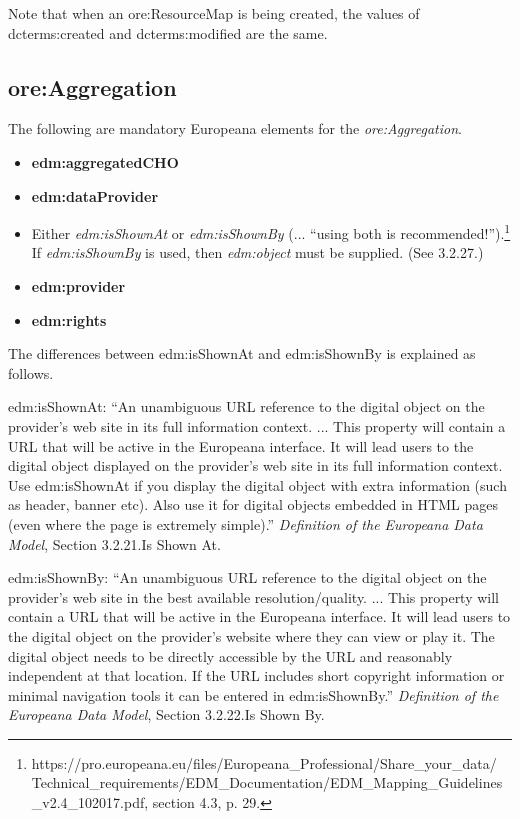 \documentclass[11pt]{article}
\begin{document}
Note that when an ore:ResourceMap is being created, the values of dcterms:created and dcterms:modified are the same.

\subsection{ore:Aggregation}

The following are mandatory Europeana elements for the \textit{ore:Aggregation}.

\begin{itemize}
\item \textbf{edm:aggregatedCHO}
\item \textbf{edm:dataProvider}
\item Either \textit{edm:isShownAt} or \textit{edm:isShownBy} (... ``using both is recommended!'').\footnote{https://pro.europeana.eu/files/Europeana\_Professional/Share\_your\_data/
Technical\_requirements/EDM\_Documentation/EDM\_Mapping\_Guidelines\_v2.4\_102017.pdf, section 4.3, p. 29.} If \textit{edm:isShownBy} is used, then \textit{edm:object} must be supplied. (See 3.2.27.)
\item \textbf{edm:provider}
\item \textbf{edm:rights}
\end{itemize}

The differences between edm:isShownAt and edm:isShownBy is explained as follows.

edm:isShownAt: ``An unambiguous URL reference to the digital object on the provider’s web
site in its full information context. ... This property will contain a URL that will be active in the Europeana
interface. It will lead users to the digital object displayed on the provider’s
web site in its full information context. Use edm:isShownAt if you display the
digital object with extra information (such as header, banner etc). Also use it
for digital objects embedded in HTML pages (even where the page is
extremely simple).'' \textit{Definition of the Europeana Data Model}, Section 3.2.21.Is Shown At.

edm:isShownBy: ``An unambiguous URL reference to the digital object on the provider’s web
site in the best available resolution/quality. ... This property will contain a URL that will be active in the Europeana
interface. It will lead users to the digital object on the provider’s website
where they can view or play it. The digital object needs to be directly
accessible by the URL and reasonably independent at that location. If the
URL includes short copyright information or minimal navigation tools it can
be entered in edm:isShownBy.'' \textit{Definition of the Europeana Data Model}, Section 3.2.22.Is Shown By.
\end{document}
